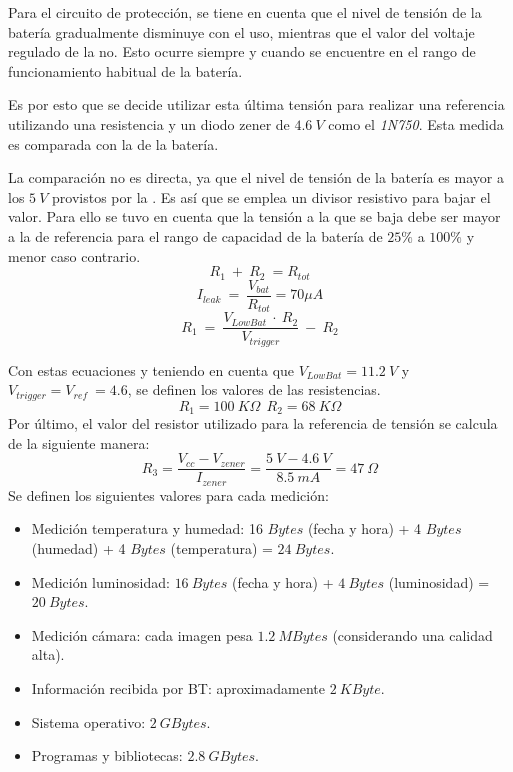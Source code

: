 Para el circuito de protección, se tiene en cuenta que el nivel de tensión de la batería gradualmente disminuye con el uso, mientras que el valor del voltaje regulado de la \rspi no. Esto ocurre siempre y cuando se encuentre en el rango de funcionamiento habitual de la batería.

Es por esto que se decide utilizar esta última tensión para realizar una referencia utilizando una resistencia y un diodo zener de $4.6 \ V$ como el \textit{1N750}. Esta medida es comparada con la de la  batería.

La comparación no es directa, ya que el nivel de tensión de la batería es mayor a los $5 \ V$ provistos por la \rspi. Es así que se emplea un divisor resistivo para bajar el valor. Para ello se tuvo en cuenta que la tensión a la que se baja debe ser mayor a la de referencia para el rango de capacidad de la batería de $25\%$ a $100\%$ y menor caso contrario.
\begin{equation}
R_1 \ +\ R_2 \ = R_{tot}
\end{equation}
\begin{equation}
I_{leak} \ = \ \frac{V_{bat}}{R_{tot}}  = 70 \mu A
\end{equation}
\begin{equation}
R_1 \ = \ \frac{V_{LowBat} \ \cdot \ R_2}{V_{trigger}} \ - \ R_2
\end{equation}

Con estas ecuaciones y teniendo en cuenta que $V_{LowBat} = 11.2 \ V$ y $V_{trigger} = V_{ref} \ = 4.6$, se definen los valores de las resistencias.
\begin{equation}
R_1 = 100 \ K\Omega  \ \ R_2 = 68 \ K\Omega
\end{equation}
Por último, el valor del resistor utilizado para la referencia de tensión se calcula de la siguiente manera:
\begin{equation}
	R_3 = \frac{V_{cc} - V_{zener}}{I_{zener}} = \frac{5 \ V - 4.6 \ V}{8.5 \ mA} = 47 \ \Omega
\end{equation}
Se definen los siguientes valores para cada medición:
\begin{itemize}

	\item Medición temperatura y humedad: 16 $Bytes$ (fecha y hora) + 4 $Bytes$ (humedad) + 4 $Bytes$ (temperatura) = $24 \ Bytes$.
	\item Medición luminosidad: $16 \ Bytes$ (fecha y hora) + $4 \ Bytes$ (luminosidad) = $20 \ Bytes$.
	\item Medición cámara: cada imagen pesa $1.2 \ MBytes$ \cite{ref:rpicam} (considerando una calidad alta).
	\item Información recibida por BT: aproximadamente $2 \ KByte$.
	\item Sistema operativo: $2 \ GBytes$.
	\item Programas y bibliotecas: $2.8 \ GBytes$.
\end{itemize}

